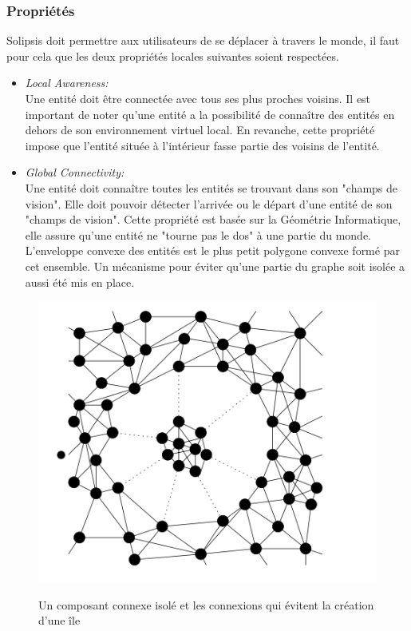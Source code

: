 		\subsubsection{Propriétés}
	Solipsis doit permettre aux utilisateurs de se déplacer à travers le monde, il faut pour cela que les deux propriétés locales suivantes soient respectées.
	\begin{itemize}
	\renewcommand{\labelitemi}{$\bullet$}
		\item \textit{Local Awareness:}\\
		Une entité doit être connectée avec tous ses plus proches voisins. Il est important de noter qu'une entité a la possibilité de connaître des entités en dehors de son environnement virtuel local. En revanche, cette propriété impose que l'entité située à l'intérieur fasse partie des voisins de l'entité.	
		\item \textit{Global Connectivity:}\\
		Une entité doit connaître toutes les entités se trouvant dans son "champs de vision". Elle doit pouvoir détecter l'arrivée ou le départ d'une entité de son "champs de vision". Cette propriété est basée sur la Géométrie Informatique, elle assure qu'une entité ne "tourne pas le dos" à une partie du monde. L'enveloppe convexe des entités est le plus petit polygone convexe formé par cet ensemble. Un mécanisme pour éviter qu'une partie du graphe soit isolée a aussi été mis en place.\\
	\end{itemize}
        \vspace{1cm}
	\begin{figure}[!h]
	\centering
        \includegraphics[scale=0.9]{./Ressources/Images/composant_isole1.png}\\
        \caption{Un composant connexe isolé et les connexions qui évitent la création d'une île}
        \label{Envelop_Convex}
        \end{figure}

